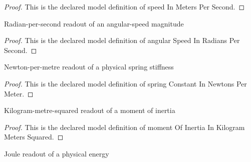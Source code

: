 \begin{proof}
  This is the declared model definition of speed In Meters Per Second.
\end{proof}
\begin{definition}
  \label{def:physics:phyx-mini-0279:phyxminiproblems-problemphyxmini0279-angularspeedinradianspersecond}
  Radian-per-second readout of an angular-speed magnitude
\end{definition}
\begin{proof}
  This is the declared model definition of angular Speed In Radians Per Second.
\end{proof}
\begin{definition}
  \label{def:physics:phyx-mini-0279:phyxminiproblems-problemphyxmini0279-springconstantinnewtonspermeter}
  Newton-per-metre readout of a physical spring stiffness
\end{definition}
\begin{proof}
  This is the declared model definition of spring Constant In Newtons Per Meter.
\end{proof}
\begin{definition}
  \label{def:physics:phyx-mini-0279:phyxminiproblems-problemphyxmini0279-momentofinertiainkilogrammeterssquared}
  Kilogram-metre-squared readout of a moment of inertia
\end{definition}
\begin{proof}
  This is the declared model definition of moment Of Inertia In Kilogram Meters Squared.
\end{proof}
\begin{definition}
  \label{def:physics:phyx-mini-0279:phyxminiproblems-problemphyxmini0279-energyinjoules}
  Joule readout of a physical energy
\end{definition}
